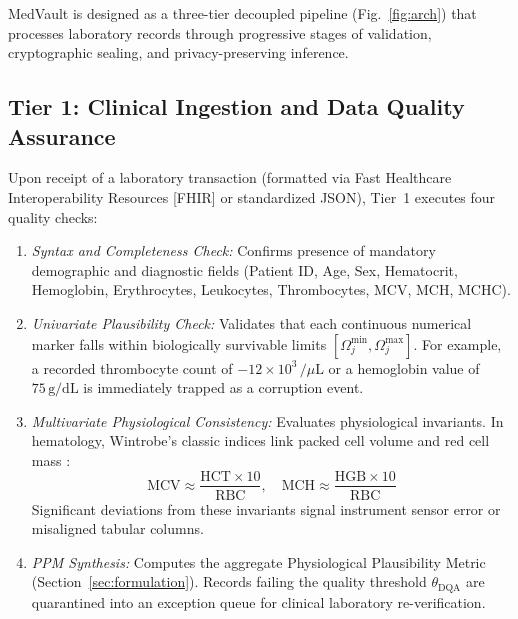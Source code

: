 \documentclass[conference]{IEEEtran}
\begin{document}
MedVault is designed as a three-tier decoupled pipeline (Fig.~\ref{fig:arch}) that processes laboratory records through progressive stages of validation, cryptographic sealing, and privacy-preserving inference.

\subsection{Tier 1: Clinical Ingestion and Data Quality Assurance}
Upon receipt of a laboratory transaction (formatted via Fast Healthcare Interoperability Resources [FHIR] or standardized JSON), Tier~1 executes four quality checks:
\begin{enumerate}
    \item \textit{Syntax and Completeness Check:} Confirms presence of mandatory demographic and diagnostic fields (Patient ID, Age, Sex, Hematocrit, Hemoglobin, Erythrocytes, Leukocytes, Thrombocytes, MCV, MCH, MCHC).
    \item \textit{Univariate Plausibility Check:} Validates that each continuous numerical marker falls within biologically survivable limits $[\Omega_j^{\min}, \Omega_j^{\max}]$. For example, a recorded thrombocyte count of $-12\times 10^3\,/\mu\text{L}$ or a hemoglobin value of $75\,\text{g/dL}$ is immediately trapped as a corruption event.
    \item \textit{Multivariate Physiological Consistency:} Evaluates physiological invariants. In hematology, Wintrobe's classic indices link packed cell volume and red cell mass \cite{britton2016complete}:
    \begin{equation}
        \text{MCV} \approx \frac{\text{HCT} \times 10}{\text{RBC}}, \quad \text{MCH} \approx \frac{\text{HGB} \times 10}{\text{RBC}}
        \label{eq:wintrobe}
    \end{equation}
    Significant deviations from these invariants signal instrument sensor error or misaligned tabular columns.
    \item \textit{PPM Synthesis:} Computes the aggregate Physiological Plausibility Metric (Section~\ref{sec:formulation}). Records failing the quality threshold $\theta_{\text{DQA}}$ are quarantined into an exception queue for clinical laboratory re-verification.
\end{enumerate}
\end{document}

